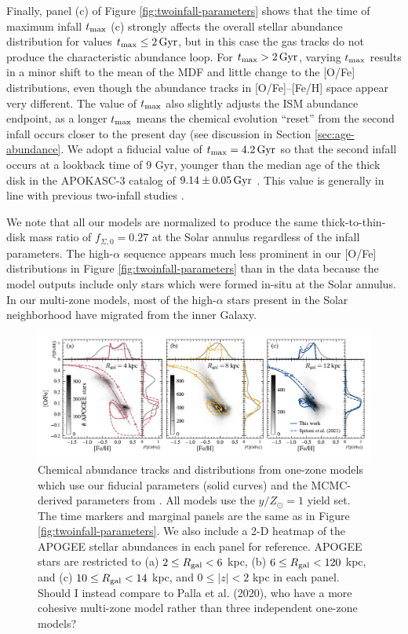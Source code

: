 \documentclass[twocolumn,twocolappendix,linenumbers]{aastex631}
\newcommand{\todo}[1]{{\color{red}#1}}
\begin{document}
Finally, panel (c) of Figure \ref{fig:twoinfall-parameters} shows that the time of maximum infall $t_{\rm max}$ (c) strongly affects the overall stellar abundance distribution for values $t_{\rm max}\leq2\,{\rm Gyr}$, but in this case the gas tracks do not produce the characteristic abundance loop. For $t_{\rm max}>2\,{\rm Gyr}$, varying $t_{\rm max}$ results in a minor shift to the mean of the MDF and little change to the [O/Fe] distributions, even though the abundance tracks in [O/Fe]--[Fe/H] space appear very different. The value of $t_{\rm max}$ also slightly adjusts the ISM abundance endpoint, as a longer $t_{\rm max}$ means the chemical evolution ``reset'' from the second infall occurs closer to the present day (see discussion in Section \ref{sec:age-abundance}. We adopt a fiducial value of $t_{\rm max}=4.2\,{\rm Gyr}$ so that the second infall occurs at a lookback time of 9 Gyr, younger than the median age of the thick disk in the APOKASC-3 catalog of $9.14\pm0.05\,{\rm Gyr}$ \citep{pinsonneault_apokasc-3_2025}. This value is generally in line with previous two-infall studies \citep[e.g.,][]{nissen_high-precision_2020,spitoni_galactic_2020,spitoni_apogee_2021}.

We note that all our models are normalized to produce the same thick-to-thin-disk mass ratio of $f_{\Sigma,0}=0.27$ \citep{bland-hawthorn_galaxy_2016} at the Solar annulus regardless of the infall parameters. The high-$\alpha$ sequence appears much less prominent in our [O/Fe] distributions in Figure \ref{fig:twoinfall-parameters} than in the data because the model outputs include only stars which were formed in-situ at the Solar annulus. In our multi-zone models, most of the high-$\alpha$ stars present in the Solar neighborhood have migrated from the inner Galaxy.

\begin{figure}
    \centering
    \includegraphics{figures/spitoni_comparison.pdf}
    \caption{Chemical abundance tracks and distributions from one-zone models which use our fiducial parameters (solid curves) and the MCMC-derived parameters from \citet[][dashed curves]{spitoni_apogee_2021}. All models use the $y/Z_\odot=1$ yield set. The time markers and marginal panels are the same as in Figure \ref{fig:twoinfall-parameters}. We also include a 2-D heatmap of the APOGEE stellar abundances in each panel for reference. APOGEE stars are restricted to (a) $2\leq R_{\rm gal}<6$ kpc, (b) $6\leq R_{\rm gal}<120$ kpc, and (c) $10\leq R_{\rm gal}<14$ kpc, and $0\leq |z|<2$ kpc in each panel. \todo{Should I instead compare to Palla et al. (2020), who have a more cohesive multi-zone model rather than three independent one-zone models?}}
    \label{fig:spitoni-comparison}
\end{figure}
\end{document}
